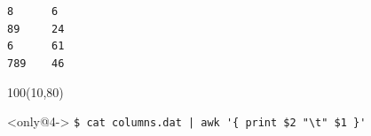 \documentclass{beamer}
\begin{document}
\begin{frame}[fragile,t]
\begin{textblock}{30}
\begin{block}
    \verb:8      6   :\\
    \verb:89     24  :\\
    \verb:6      61  :\\
    \verb:789    46  :\\
    \vspace*{0.5ex}
    \end{block}
    \end{textblock}
    \begin{textblock}{100}(10,80)
    \begin{block}<only@4->{\vspace*{-3ex}}
    \texttt{\$}\verb: cat columns.dat | awk '{ print $2 "\t" $1 }':
    \vspace*{0.5ex}
    \end{block}
    \end{textblock}
\end{frame}
\end{document}
